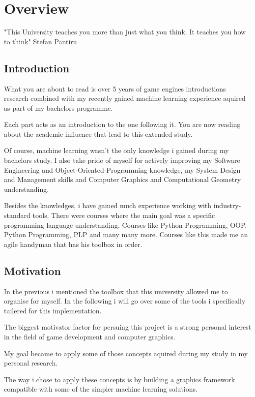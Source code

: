\part{Overview}
  "This University teaches you more than just what you think. It teaches you how to think" Stefan Pantiru
  \chapter*{Introduction} 
    What you are about to read is over 5 years of game engines introductions research combined with my recently gained machine learning experience aquired as part of my bachelors programme. 

    Each part acts as an introduction to the one following it. You are now reading about the academic influence that lead to this extended study.

    Of course, machine learning wasn't the only knowledge i gained during my bachelors study. I also take pride of myself for actively improving my Software Engineering and Object-Oriented-Programming knowledge, my System Design and Management skills and Computer Graphics and Computational Geometry understanding. 

    Besides the knowledges, i have gained much experience working with industry-standard tools. There were courses where the main goal was a specific programming language understanding. Courses like Python Programming, OOP, Python Programming, PLP and many many more. Courses like this made me an agile handyman that has his toolbox in order.

  \chapter*{Motivation}

  In the previous i mentioned the toolbox that this university allowed me to organise for myself. In the following i will go over some of the tools i specifically tailered for this implementation.

  The biggest motivator factor for persuing this project is a strong personal interest in the field of game development and computer graphics.

  My goal became to apply some of those concepts aquired during my study in my personal research.

  The way i chose to apply these concepts is by building a graphics framework compatible with some of the simpler machine learning solutions.


